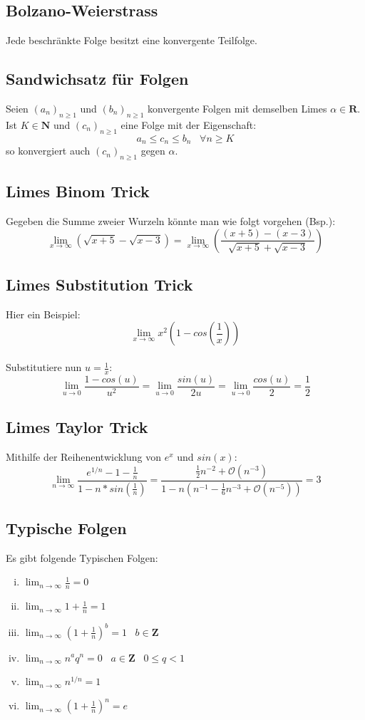\documentclass[8pt]{article}
\begin{document}
\begin{multicols*}{3}
 \subsection{Bolzano-Weierstrass}
Jede beschränkte Folge besitzt eine konvergente Teilfolge.
  \subsection {Sandwichsatz für Folgen}
Seien $(a_n)_{n \geq 1}$ und $(b_n)_{n \geq 1}$ konvergente Folgen mit demselben Limes
$\alpha \in \mathbf{R}$. Ist $K \in \mathbf{N}$ und $(c_n)_{n \geq 1}$ eine Folge
mit der Eigenschaft: $$a_n \leq c_n \leq b_n \; \; \; \forall n \geq K$$ so konvergiert
auch $(c_n)_{n \geq 1}$ gegen $\alpha$.
  \subsection{Limes Binom Trick}
Gegeben die Summe zweier Wurzeln könnte man wie folgt
vorgehen (Bsp.):
$$
  \lim_{x \rightarrow \infty} (\sqrt{x + 5} - \sqrt{x - 3}) = \lim_{x \rightarrow \infty} (\frac{(x + 5) - (x - 3)}{\sqrt{x + 5} + \sqrt{x - 3}})
$$
  \subsection{Limes Substitution Trick}
Hier ein Beispiel:
$$
  \lim_{x \rightarrow \infty} x^2 (1 - cos(\frac{1}{x}))
$$\\
Substitutiere nun $u = \frac{1}{x}$:
$$
\lim_{u \rightarrow 0} \frac{1 - cos(u)}{u^2} = \lim_{u \rightarrow 0} \frac{sin(u)}{2u} = \lim_{u \rightarrow 0} \frac{cos(u)}{2} = \frac{1}{2}
$$

  \subsection{Limes Taylor Trick}

Mithilfe der Reihenentwicklung von $e^x$ und $sin(x)$:
$$
\lim_{n \rightarrow \infty} \frac{e^{1/n} - 1 - \frac{1}{n}}{1 - n * sin(\frac{1}{n})} = \frac{\frac{1}{2}n^{-2} + \mathcal{O}(n^{-3})}{1 - n(n^{-1} - \frac{1}{6}n^{-3} + \mathcal{O}(n^{-5}))} = 3
$$
  \subsection {Typische Folgen}
Es gibt folgende Typischen Folgen:
\begin{enumerate}[(i)]
  \item $\lim_{n \rightarrow \infty} \frac{1}{n} = 0$
  \item $\lim_{n \rightarrow \infty} 1 + \frac{1}{n} = 1$
  \item $\lim_{n \rightarrow \infty} (1 + \frac{1}{n})^b = 1 \;\;\; b \in \mathbf{Z}$
  \item $\lim_{n \rightarrow \infty} n^a q ^n = 0 \;\;\; a \in \mathbf{Z} \;\;\; 0 \leq q < 1$
  \item $\lim_{n \rightarrow \infty} n^{1 / n} = 1$
  \item $\lim_{n \rightarrow \infty} (1 + \frac{1}{n})^n = e$
\end{enumerate}

\end{multicols*}
\end{document}
